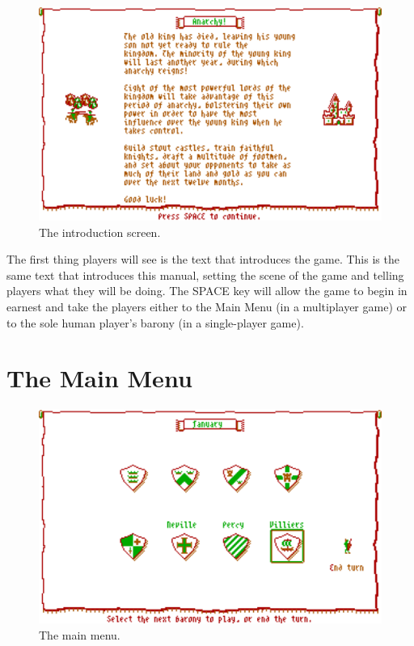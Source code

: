 \documentclass[8pt]{extarticle}
\begin{document}
\begin{figure}
  \centering
  \includegraphics[width=\textwidth]{intro}
  \caption*{The introduction screen.}
  \label{fig:title}
\end{figure}

\begin{multicols}{2}
\noindent
The first thing players will see is the text that introduces the game. This is the same text that introduces this manual, setting the scene of the game and telling players what they will be doing. The SPACE key will allow the game to begin in earnest and take the players either to the Main Menu (in a multiplayer game) or to the sole human player's barony (in a single-player game).
\end{multicols}

%
%

\pagebreak %
\section*{The Main Menu}

\begin{figure}
  \centering
  \includegraphics[width=\textwidth]{mainmenu}
  \caption*{The main menu.}
  \label{fig:title}
\end{figure}
\end{document}
